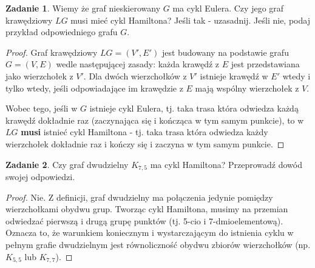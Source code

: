 \documentclass[11pt]{article}
\theoremstyle{definition}
\newtheorem{zadanie}{Zadanie}
\begin{document}
\begin{zadanie}
    Wiemy że graf nieskierowany $G$ ma cykl Eulera. Czy jego graf krawędziowy $LG$ musi mieć cykl Hamiltona? Jeśli tak - uzasadnij. Jeśli nie, podaj przykład odpowiedniego grafu $G$.
\end{zadanie}
\begin{proof}
    Graf krawędziowy $LG = (V', E')$ jest budowany na podstawie grafu $G=(V,E)$ wedle następującej zasady: każda krawędź z $E$ jest przedstawiana jako wierzchołek z $V'$. Dla dwóch wierzchołków z $V'$ istnieje krawędź w $E'$ wtedy i tylko wtedy, jeśli odpowiadające im krawędzie z $E$ mają wspólny wierzchołek z $V$.

    Wobec tego, jeśli w $G$ istnieje cykl Eulera, tj. taka trasa która odwiedza każdą krawędź dokładnie raz (zaczynająca się i kończąca w tym samym punkcie), to w $LG$ \textbf{musi} istnieć cykl Hamiltona - tj. taka trasa która odwiedza każdy wierzchołek dokładnie raz i kończy się i zaczyna w tym samym punkcie.
\end{proof}

\begin{zadanie}
    Czy graf dwudzielny $K_{7,5}$ ma cykl Hamiltona? Przeprowadź dowód swojej odpowiedzi.
\end{zadanie}
\begin{proof}
    Nie. Z definicji, graf dwudzielny ma połączenia jedynie pomiędzy wierzchołkami obydwu grup. Tworząc cykl Hamiltona, musimy na przemian odwiedzać pierwszą i drugą grupę punktów (tj. 5-cio i 7-dmioelementową). Oznacza to, że warunkiem koniecznym i wystarczającym do istnienia cyklu w pełnym grafie dwudzielnym jest równoliczność obydwu zbiorów wierzchołków (np. $K_{5,5}$ lub $K_{7,7}$).
\end{proof}
\end{document}
